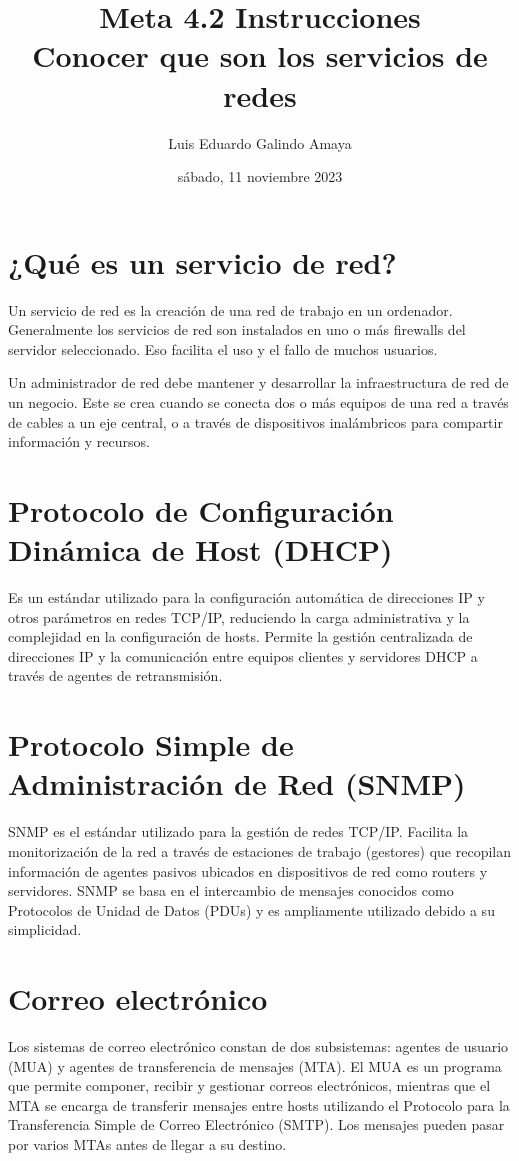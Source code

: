 \documentclass[11pt]{article}
\author{Luis Eduardo Galindo Amaya}
\date{sábado, 11 noviembre 2023}
\title{Meta 4.2 Instrucciones\\\medskip
\large Conocer que son los servicios de redes}
\begin{document}
\tableofcontents
\pagebreak
{}

\section{¿Qué es un servicio de red?}
\label{sec:org45a1d55}
\autocite{Wikipedia_2023} Un servicio de red es la creación de
una red de trabajo en un ordenador. Generalmente los servicios de red
son instalados en uno o más firewalls del servidor seleccionado. Eso
facilita el uso y el fallo de muchos usuarios.

Un administrador de red debe mantener y desarrollar la infraestructura
de red de un negocio. Este se crea cuando se conecta dos o más equipos
de una red a través de cables a un eje central, o a través de
dispositivos inalámbricos para compartir información y recursos.

\section{Protocolo de Configuración Dinámica de Host (DHCP)}
\label{sec:org353cdb6}
Es un estándar utilizado para la configuración automática de
direcciones IP y otros parámetros en redes TCP/IP, reduciendo la carga
administrativa y la complejidad en la configuración de hosts. Permite
la gestión centralizada de direcciones IP y la comunicación entre
equipos clientes y servidores DHCP a través de agentes de
retransmisión. 

\section{Protocolo Simple de Administración de Red (SNMP)}
\label{sec:org814df06}
SNMP es el estándar utilizado para la gestión de redes
TCP/IP. Facilita la monitorización de la red a través de estaciones de
trabajo (gestores) que recopilan información de agentes pasivos
ubicados en dispositivos de red como routers y servidores. SNMP se
basa en el intercambio de mensajes conocidos como Protocolos de Unidad
de Datos (PDUs) y es ampliamente utilizado debido a su simplicidad. 

\section{Correo electrónico}
\label{sec:orgaae7237}
Los sistemas de correo electrónico constan de dos subsistemas: agentes
de usuario (MUA) y agentes de transferencia de mensajes (MTA). El MUA
es un programa que permite componer, recibir y gestionar correos
electrónicos, mientras que el MTA se encarga de transferir mensajes
entre hosts utilizando el Protocolo para la Transferencia Simple de
Correo Electrónico (SMTP). Los mensajes pueden pasar por varios MTAs
antes de llegar a su destino. 
\end{document}

